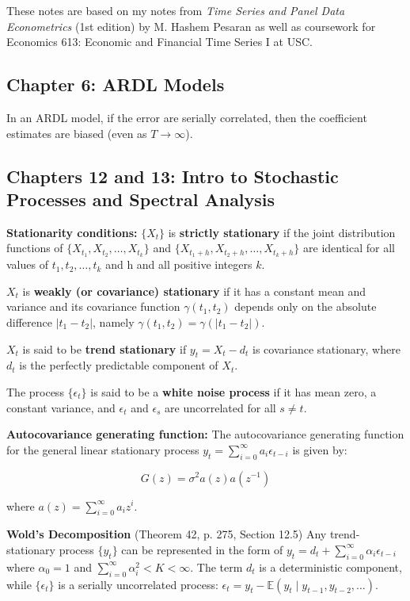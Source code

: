 \documentclass{article}
\newcommand{\E}{\mathbb{E}}
\begin{document}
These notes are based on my notes from \textit{Time Series and Panel Data Econometrics} (1st edition) by M. Hashem Pesaran as well as coursework for Economics 613: Economic and Financial Time Series I at USC.

\subsection{Chapter 6: ARDL Models}

In an ARDL model, if the error are serially correlated, then the coefficient estimates are biased (even as \(T \to \infty\)).


\subsection{Chapters 12 and 13: Intro to Stochastic Processes and Spectral Analysis}

\textbf{Stationarity conditions:} \( \{X_t\} \) is \textbf{strictly stationary} if the joint distribution functions of \( \{ X_{t_1}, X_{t_2}, \ldots, X_{t_k}\} \) and \( \{ X_{t_1+h}, X_{t_2+h}, \ldots, X_{t_k+h}\} \) are identical for all values of \(t_1,  t_2, \ldots, t_k\) and h and all positive integers \(k\). 

\(X_t\) is \textbf{weakly (or covariance) stationary} if it has a constant mean and variance and its covariance function \(\gamma(t_1, t_2)\) depends only on the absolute difference \(| t_1 - t_2|\), namely \(\gamma(t_1, t_2) = \gamma(|t_1 - t_2|)\).

\(X_t\) is said to be \textbf{trend stationary} if \(y_t = X_t - d_t\) is covariance stationary, where \(d_t\) is the perfectly predictable component of \(X_t\).

The process \(\{\epsilon_t\} \) is said to be a \textbf{white noise process} if it has mean zero, a constant variance, and \(\epsilon_t\) and \(\epsilon_s\) are uncorrelated for all \(s \neq t\).

\textbf{Autocovariance generating function:} The autocovariance generating function for the general linear stationary process \(y_t = \sum_{i=0}^\infty a_i \epsilon_{t-i}\) is given by:

\[
G(z) = \sigma^2 a(z)a(z^{-1})
\]

where \(a(z) = \sum_{i=0}^\infty a_i z^i\). 

\textbf{Wold's Decomposition} (Theorem 42, p. 275, Section 12.5) Any trend-stationary process \(\{y_t\}\) can be represented in the form of \(y_t = d_t + \sum_{i=0}^\infty \alpha_i \epsilon_{t-i}\) where \(\alpha_0 = 1\) and \(\sum_{i=0}^\infty \alpha_i^2 < K < \infty\). The term \(d_t\) is a deterministic component, while \(\{\epsilon_t\}\) is a serially uncorrelated process: \(\epsilon_t = y_t - \E(y_t \mid y_{t-1}, y_{t-2}, \ldots) \).
\end{document}
